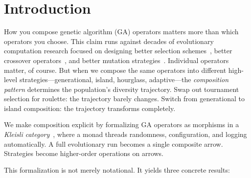 \documentclass[sigconf]{acmart}
\begin{document}


\maketitle

\section{Introduction}

How you compose genetic algorithm (GA) operators matters more than which operators you choose. This claim runs against decades of evolutionary computation research focused on designing better selection schemes~\cite{blickle1996comparison}, better crossover operators~\cite{eshelman1993crossover}, and better mutation strategies~\cite{back1996evolutionary}. Individual operators matter, of course. But when we compose the same operators into different high-level strategies---generational, island, hourglass, adaptive---the \emph{composition pattern} determines the population's diversity trajectory. Swap out tournament selection for roulette: the trajectory barely changes. Switch from generational to island composition: the trajectory transforms completely.

We make composition explicit by formalizing GA operators as morphisms in a \emph{Kleisli category}~\cite{moggi1991notions}, where a monad threads randomness, configuration, and logging automatically. A full evolutionary run becomes a single composite arrow. Strategies become higher-order operations on arrows.

This formalization is not merely notational. It yields three concrete results:
\end{document}
